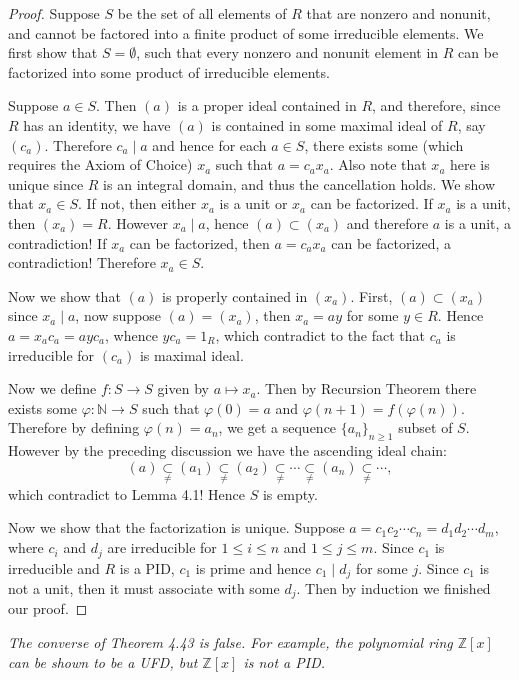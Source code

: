 \begin{proof}
Suppose $S$ be the set of all elements of $R$ that are nonzero and nonunit, and cannot be factored into a finite product of some irreducible elements. We first show that $S=\emptyset$, such that every nonzero and nonunit element in $R$ can be factorized into some product of irreducible elements.\par
Suppose $a\in S$. Then $(a)$ is a proper ideal contained in $R$, and therefore, since $R$ has an identity, we have $(a)$ is contained in some maximal ideal of $R$, say $(c_a)$. Therefore $c_a\mid a$ and hence for each $a\in S$, there exists some (which requires the Axiom of Choice) $x_a$ such that $a=c_ax_a$. Also note that $x_a$ here is unique since $R$ is an integral domain, and thus the cancellation holds. We show that $x_a\in S$. If not, then either $x_a$ is a unit or $x_a$ can be factorized. If $x_a$ is a unit, then $(x_a)=R$. However $x_a\mid a$, hence $(a)\subset(x_a)$ and therefore $a$ is a unit, a contradiction! If $x_a$ can be factorized, then $a=c_ax_a$ can be factorized, a contradiction! Therefore $x_a\in S$.\par
Now we show that $(a)$ is properly contained in $(x_a)$. First, $(a)\subset(x_a)$ since $x_a\mid a$, now suppose $(a)=(x_a)$, then $x_a=ay$ for some $y\in R$. Hence $a=x_ac_a=ayc_a$, whence $yc_a=1_R$, which contradict to the fact that $c_a$ is irreducible for $(c_a)$ is maximal ideal.\par
Now we define $f:S\to S$ given by $a\mapsto x_a$. Then by Recursion Theorem there exists some $\varphi:\mathbb{N}\to S$ such that $\varphi(0)=a$ and $\varphi(n+1)=f(\varphi(n))$. Therefore by defining $\varphi(n)=a_n$, we get a sequence $\{a_n\}_{n\ge 1}$ subset of $S$. However by the preceding discussion we have the ascending ideal chain:
$$
\left( a \right) \underset{\ne}{\subset}\left( a_1 \right) \underset{\ne}{\subset}\left( a_2 \right) \underset{\ne}{\subset}\cdots \underset{\ne}{\subset}\left( a_n \right) \underset{\ne}{\subset}\cdots ,
$$
which contradict to Lemma 4.1! Hence $S$ is empty.\par
Now we show that the factorization is unique. Suppose $a=c_1c_2\cdots c_n=d_1d_2\cdots d_m$, where $c_i$ and $d_j$ are irreducible for $1\le i\le n$ and $1\le j\le m$. Since $c_1$ is irreducible and $R$ is a PID, $c_1$ is prime and hence $c_1\mid d_j$ for some $j$. Since $c_1$ is not a unit, then it must associate with some $d_j$. Then by induction we finished our proof.
\end{proof}
\begin{note}\em
The converse of Theorem 4.43 is false. For example, the polynomial ring $\mathbb{Z}[x]$ can be shown to be a UFD, but $\mathbb{Z}[x]$ is not a PID.
\end{note}
